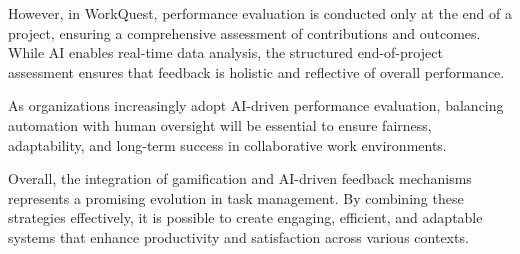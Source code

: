     However, in WorkQuest, performance evaluation is conducted only at the end of a project, ensuring a comprehensive assessment of contributions and outcomes. While AI enables real-time data analysis, the structured end-of-project assessment ensures that feedback is holistic and reflective of overall performance.

    As organizations increasingly adopt AI-driven performance evaluation, balancing automation with human oversight will be essential to ensure fairness, adaptability, and long-term success in collaborative work environments.

    Overall, the integration of gamification and AI-driven feedback mechanisms represents a promising evolution in task management. By combining these strategies effectively, it is possible to create engaging, efficient, and adaptable systems that enhance productivity and satisfaction across various contexts.



